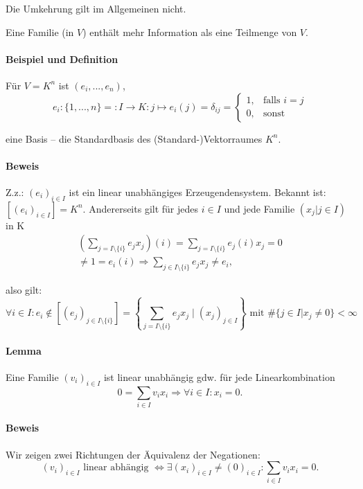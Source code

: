 	Die Umkehrung gilt im Allgemeinen nicht.

	Eine Familie (in $ V $) enthält mehr Information als eine Teilmenge von $ V $.
	
\paragraph{Beispiel und Definition}
	Für $V = K^n$ ist $(e_i, ... , e_n)$,
	\begin{equation*}
		e_i:\{{1, ... ,n\}} =: I\to K: j\mapsto e_i(j)= \delta_{ij}=
		\begin{cases}
			1,& \text{falls } i=j\\
			0,& \text{sonst}
		\end{cases}
	\end{equation*}

	eine Basis -- die Standardbasis des (Standard-)Vektorraumes $K^n$.

\paragraph{Beweis}
	Z.z.: $ (e_i)_{i\in I} $ ist ein linear unabhängiges Erzeugendensystem. Bekannt ist: $ [(e_i)_{i\in I}] = K^n $. Andererseits gilt für jedes $i\in I$ und jede Familie $(x_j| j\in I)$ in K
	\begin{align*}
		\left(\sum_{j= I\setminus\{i\}}e_jx_j\right)(i) = \sum_{j=I\setminus\{i\}}e_j(i)x_j = 0\\
		\neq 1 = e_i(i) \Rightarrow \sum_{j\in I\setminus\{i\}} e_jx_j \neq e_i,
	\end{align*}
	
	also gilt:
	\begin{equation*}
		\forall i\in I: e_i \notin [(e_j)_{j\in I\setminus\{i\}}] = \left\{\sum_{j=I\setminus\{i\}} e_jx_j\mid (x_j)_{ j\in I}\right\} \text{ mit } \#\{j\in I| x_j \neq 0\}<\infty
	\end{equation*}
	
\paragraph{Lemma}
	Eine Familie $(v_i)_{i\in I}$ ist linear unabhängig gdw. für jede Linearkombination
	\begin{equation*}
		0 = \sum_{i\in I} v_ix_i \Rightarrow \forall i\in I: x_i = 0.
	\end{equation*}

\paragraph{Beweis}
	Wir zeigen zwei Richtungen der Äquivalenz der Negationen: 
	\begin{equation*}
		(v_i)_{i\in I} \text{ linear abhängig } \Leftrightarrow \exists(x_i)_{i\in I} \neq (0)_{i\in I}: \sum_{i\in I} v_ix_i = 0.
	\end{equation*}

